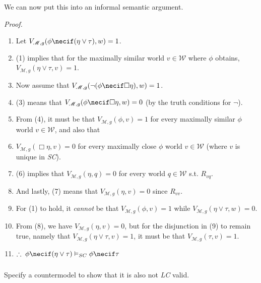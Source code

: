 \documentclass{article}
\begin{document}
        We can now put this into an informal semantic argument. 

        \textit{Proof.}
        \begin{enumerate}
            \item Let $V_{\mathscr{M}, g}(\phi \necif (\eta \vee \tau), w) = 1$.
            \item (1) implies that for the maximally similar world $v \in \mathscr{W}$ where $\phi$ obtains, $V_{\mathscr{M}, g}(\eta \vee \tau, v) = 1$.
            \item Now assume that $V_{\mathscr{M},g}(\lnot (\phi \necif \Box \eta), w) = 1$.
            \item (3) means that $V_{\mathscr{M}, g}(\phi \necif \Box \eta, w) = 0$ (by the truth conditions for $\lnot$).
            \item From (4), it must be that $V_{\mathscr{M},g}(\phi, v) = 1$ for every maximally similar $\phi$ world $v \in \mathscr{W}$, and also that
            \item $V_{\mathscr{M},g}(\Box\eta, v) = 0$ for every maximally close $\phi$ world $v\in \mathscr{W}$ (where $v$ is unique in \textit{SC}).
            \item (6) implies that $V_{\mathscr{M},g}(\eta, q) = 0$ for every world $q \in \mathscr{W}$ s.t. $R_{vq}$.
            \item And lastly, (7) means that $V_{\mathscr{M}, g}(\eta, v) = 0$ since $R_{vv}$.
            \item For (1) to hold, it \textit{cannot} be that $V_{\mathscr{M}, g}(\phi, v) = 1$ while $V_{\mathscr{M}, g}(\eta \vee \tau, w) = 0$.
            \item From (8), we have $V_{\mathscr{M}, g}(\eta, v) = 0$, but for the disjunction in (9) to remain true, namely that $V_{\mathscr{M}, g}(\eta \vee \tau, v) = 1$, it must be that $V_{\mathscr{M},g}(\tau, v) = 1$.
            \item $\therefore \; \phi \necif (\eta \vee \tau) \vDash_{SC} \phi \necif \tau$
        \end{enumerate}

        \subsubsection{}
        \begin{task}
            Specify a countermodel to show that it is also not \textit{LC} valid.
        \end{task}
\end{document}
